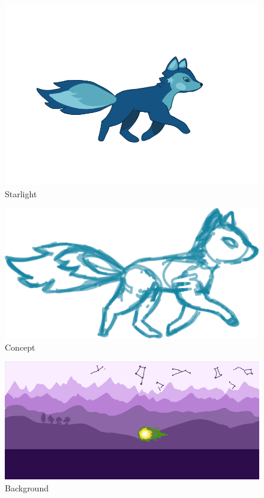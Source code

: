 \documentclass[a4paper,10pt,english]{article}
\begin{document}
\begin{figure}[ht]
    \centering
    \includegraphics[width=0.7\linewidth]{starlight.png}
    \caption{Starlight}
\end{figure}
\begin{figure}[ht]
    \centering
    \includegraphics[width=0.5\linewidth]{concept.png}
    \caption{Concept}
\end{figure}
\begin{figure}[ht]
    \centering
    \includegraphics[width=0.7\linewidth]{background.png}
    \caption{Background}
\end{figure}
\end{document}
